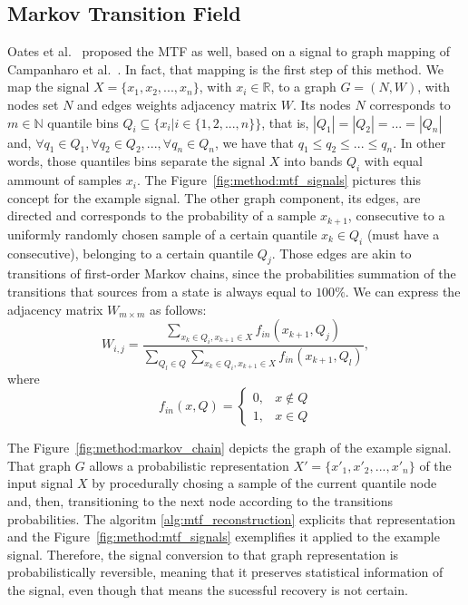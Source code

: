 \subsection{Markov Transition Field}

Oates et al.~\cite{gaf-mtf-1} proposed the \gls{MTF} as well, based on a signal to graph mapping of Campanharo et al.~\cite{mtf-1}. In fact, that mapping is the first step of this method. We map the signal $X=\{x_1,x_2,...,x_n\}$, with $x_i \in \mathbb{R}$, to a graph $G=(N,W)$, with nodes set $N$ and edges weights adjacency matrix $W$. Its nodes $N$ corresponds to $m \in \mathbb{N}$ quantile bins $Q_i \subseteq \{x_i | i \in \{1,2,...,n\}\}$, that is, $|Q_1|=|Q_2|=...=|Q_n|$ and, $\forall q_1 \in Q_1, \forall q_2 \in Q_2, ..., \forall q_n \in Q_n$, we have that $q_1 \leq q_2 \leq ... \leq q_n$. In other words, those quantiles bins separate the signal $X$ into bands $Q_i$ with equal ammount of samples $x_i$. The Figure~\ref{fig:method:mtf_signals} pictures this concept for the example signal. The other graph component, its edges, are directed and corresponds to the probability of a sample $x_{k+1}$, consecutive to a uniformly randomly chosen sample of a certain quantile $x_k \in Q_i$ (must have a consecutive), belonging to a certain quantile $Q_j$. Those edges are akin to transitions of first-order Markov chains, since the probabilities summation of the transitions that sources from a state is always equal to $100\%$. We can express the adjacency matrix $W_{m \times m}$ as follows:  
\begin{equation}
    W_{i,j} = \frac{
            \sum\limits_{x_k \in Q_i, x_{k+1} \in X} f_{in}(x_{k+1}, Q_j)
        }{
            \sum\limits_{Q_l \in Q}\sum\limits_{x_k \in Q_i, x_{k+1} \in X} f_{in}(x_{k+1}, Q_l) 
        },
\end{equation}
where
\begin{equation}
    f_{in}(x,Q) = \begin{cases}
        0, & x \not\in Q \\
        1, & x \in Q
    \end{cases}
\end{equation}






\noindent The Figure~\ref{fig:method:markov_chain} depicts the graph of the example signal. That graph $G$ allows a probabilistic representation $X' = \{ x'_1,x'_2,...,x'_n \}$ of the input signal $X$ by procedurally chosing a sample of the current quantile node and, then, transitioning to the next node according to the transitions probabilities. The algoritm \ref{alg:mtf_reconstruction} explicits that representation and the Figure~\ref{fig:method:mtf_signals} exemplifies it applied to the example signal. Therefore, the signal conversion to that graph representation is probabilistically reversible, meaning that it preserves statistical information of the signal, even though that means the sucessful recovery is not certain.


